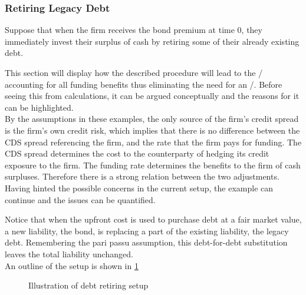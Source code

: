 \documentclass[main.tex]{subfiles}
\begin{document}
        \subsubsection{Retiring Legacy Debt}
            Suppose that when the firm receives the bond premium at time 0, 
            they immediately invest their surplus of cash by retiring some of their already existing debt.
            
            This section will display how the described procedure will lead to the \DVA/
            accounting for all funding benefits thus eliminating the need for an \FVA/.
            Before seeing this from calculations, it can be argued conceptually
            and the reasons for it can be highlighted.
            \\
            By the assumptions in these examples,
            the only source of the firm's credit spread is the firm's own credit risk, 
            which implies that there is no difference between the CDS spread referencing the firm,
            and the rate that the firm pays for funding.
            The CDS spread determines the cost to the counterparty 
            of hedging its credit exposure to the firm.
            The funding rate determines the benefits to the firm of cash surpluses.
            Therefore there is a strong relation between the two adjustments.
            \\
            Having hinted the possible concerns in the current setup, 
            the example can continue and the issues can be quantified.

            Notice that when the upfront cost is used to purchase debt at a fair market value, 
            a new liability, the bond, is replacing a part of the existing liability, the legacy debt. 
            Remembering the pari passu assumption, this debt-for-debt substitution 
            leaves the total liability unchanged.
            \\
            An outline of the setup is shown in \cref{fig:debt-retiring-setup}
            \begin{figure}[t]
                \centering
                \caption{Illustration of debt retiring setup}
                \label{fig:debt-retiring-setup}
            \end{figure}
\end{document}
